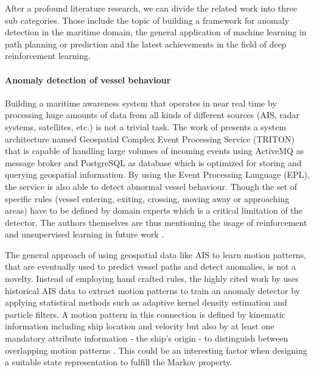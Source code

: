 After a profound literature research, we can divide the related work into three sub categories. Those include the topic of building a framework for anomaly detection in the maritime domain, the general application of machine learning in path planning or prediction and the latest achievements  in the field of deep reinforcement learning. 
\par 
\paragraph{Anomaly detection of vessel behaviour}
Building a maritime awareness system that operates in near real time by processing huge amounts of data from all kinds of different sources (AIS, radar systems, satellites, etc.) is not a trivial task. The work of \cite{tsogas2019geospatial} presents a system architecture named Geospatial Complex Event Processing Service (TRITON) that is capable of handling large volumes of incoming events using ActiveMQ as message broker and PostgreSQL as database which is optimized for storing and querying geospatial information. By using the Event Processing Language (EPL), the service is also able to detect abnormal vessel behaviour. Though the set of specific rules (vessel entering, exiting, crossing, moving away or approaching areas) have to be defined by domain experts \cite[p.~4]{tsogas2019geospatial} which is a critical limitation of the detector. The authors themselves are thus mentioning the usage of reinforcement and unsupervised learning in future work \cite[p.~9]{tsogas2019geospatial}.
\par 
The general approach of using geospatial data like AIS to learn motion patterns, that are eventually used to predict vessel paths and detect anomalies, is not a novelty. Instead of employing hand crafted rules, the highly cited work by \cite{ristic2008statistical} uses historical AIS data to extract motion patterns to train an anomaly detector by applying statistical methods such as adaptive kernel density estimation and particle filters. A motion pattern in this connection is defined by kinematic information including ship location and velocity but also by at least one mandatory attribute information - the ship's origin - to distinguish between overlapping motion patterns \cite[p.~2]{ristic2008statistical}. This could be an interesting factor when designing a suitable state representation to fulfill the Markov property.
